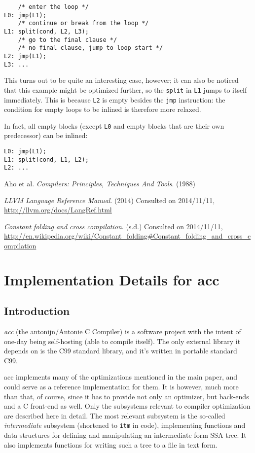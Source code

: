 \documentclass[12pt, a4paper]{article}
\begin{document}
\begin{lstlisting}
	/* enter the loop */
L0:	jmp(L1);
	/* continue or break from the loop */
L1:	split(cond, L2, L3);
	/* go to the final clause */
	/* no final clause, jump to loop start */
L2:	jmp(L1);
L3:	...
\end{lstlisting}

This turns out to be quite an interesting case, however; it can also be noticed
that this example might be optimized further, so the \verb+split+ in \verb+L1+
jumps to itself immediately. This is because \verb+L2+ is empty besides the \verb+jmp+
instruction: the condition for empty loops to be inlined is therefore more relaxed.

In fact, all empty blocks (except \verb+L0+ and empty blocks that are their own predecessor) can be inlined:

\begin{lstlisting}
L0:	jmp(L1);
L1:	split(cond, L1, L2);
L2:	...
\end{lstlisting}

\begin{thebibliography}{9}
   Aho et al.
  \emph{Compilers: Principles, Techniques And Tools}.
  (1988)

  \emph{LLVM Language Reference Manual}. (2014) Consulted on 2014/11/11,
  \url{http://llvm.org/docs/LangRef.html}

  \emph{Constant folding and cross compilation}. (s.d.) Consulted on 2014/11/11,
  \url{http://en.wikipedia.org/wiki/Constant_folding#Constant_folding_and_cross_compilation}
\end{thebibliography}


\newpage
\appendix
\section{Implementation Details for acc}
\subsection{Introduction}
  \textit{acc} (the antonijn/Antonie C Compiler) is a software project with the intent of
one-day being self-hosting (able to compile itself). The only external library
it depends on is the C99 standard library, and it's written in portable standard C99.

  acc implements many of the optimizations mentioned in the main paper, and could
serve as a reference implementation for them. It is however, much more than that,
of course, since it has to provide not only an optimizer, but back-ends and a C
front-end as well. Only the subsystems relevant to compiler optimization are
described here in detail. The most relevant subsystem is the so-called
\textit{intermediate} subsystem (shortened to \verb+itm+ in code), implementing
functions and data structures for defining and manipulating an intermediate form
SSA tree. It also implements functions for writing such a tree to a file in text
form.
\end{document}
